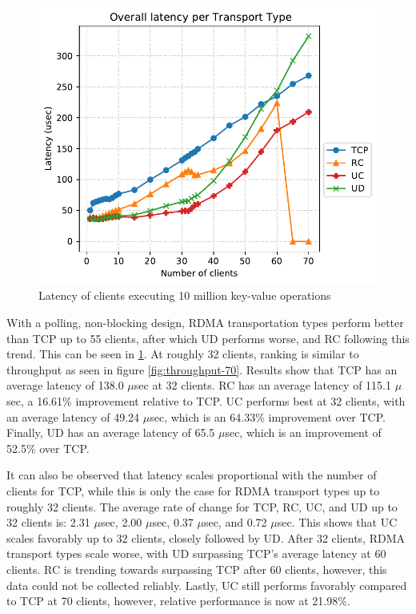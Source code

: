 \begin{figure}
    \centering
    \includegraphics[width=\columnwidth]{figures/PDF/Latency_avg_70}
    \caption{Latency of clients executing 10 million key-value operations}
    \label{fig:latency-70}
\end{figure}

With a polling, non-blocking design, RDMA transportation types perform better than TCP up to 55 clients, after which UD performs worse, and RC following this trend. This can be seen in \ref{fig:latency-70}.
At roughly 32 clients, ranking is similar to throughput as seen in figure \ref{fig:throughput-70}.
Results show that TCP has an average latency of 138.0 $\mu$sec at 32 clients.
RC has an average latency of 115.1 $\mu$sec, a 16.61\% improvement relative to TCP.
UC performs best at 32 clients, with an average latency of 49.24 $\mu$sec, which is an 64.33\% improvement over TCP.
Finally, UD has an average latency of 65.5 $\mu$sec, which is an improvement of 52.5\% over TCP.

It can also be observed that latency scales proportional with the number of clients for TCP, while this is only the case for RDMA transport types up to roughly 32 clients.
The average rate of change for TCP, RC, UC, and UD up to 32 clients is: 2.31 $\mu$sec, 2.00 $\mu$sec, 0.37 $\mu$sec, and 0.72 $\mu$sec.
This shows that UC scales favorably up to 32 clients, closely followed by UD.
After 32 clients, RDMA transport types scale worse, with UD surpassing TCP's average latency at 60 clients.
RC is trending towards surpassing TCP after 60 clients, however, this data could not be collected reliably.
Lastly, UC still performs favorably compared to TCP at 70 clients, however, relative performance is now at 21.98\%.

